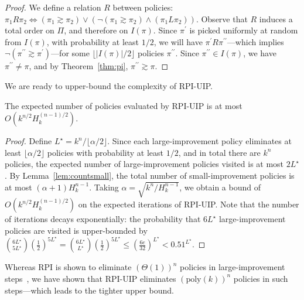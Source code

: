 \begin{proof}
We define a relation $R$ between policies: $\pi_{1}R\pi_{2} \iff (\pi_{1} \gtrsim \pi_{2}) \vee (\neg(\pi_{1} \gtrsim \pi_{2}) \wedge (\pi_{1}L\pi_{2}))$. Observe that $R$ induces a total order on $\Pi$, and therefore on $I(\pi)$. Since $\pi^{\prime}$ is picked uniformly at random from $I(\pi)$, with probability at least $1/2$, we will have $\pi^{\prime}R \pi^{\prime\prime}$---which implies $\neg(\pi^{\prime\prime} \gtrsim \pi^{\prime})$---for some  $\lfloor |I(\pi)| / 2 \rfloor$ policies $\pi^{\prime\prime}$. Since 
$\pi^{\prime\prime} \in I(\pi)$, we have
$\pi^{\prime\prime} \neq \pi$, and by Theorem~\ref{thm:pi}, $\pi^{\prime\prime} \gtrsim \pi.$
\end{proof}
We are ready to upper-bound the complexity of RPI-UIP.
\begin{theorem}
The expected number of policies evaluated by RPI-UIP is at most $O(k^{n/2}H_{k}^{(n - 1)/2})$.
\end{theorem}
\begin{proof}
Define $L^{\star} = k^{n}/\lfloor \alpha / 2\rfloor$. Since each large-improvement policy eliminates at least
$\lfloor \alpha / 2\rfloor$ policies with probability at least $1/2$, and in total there are $k^{n}$ policies, the expected number of large-improvement policies visited is at most $2L^{\star}$. 
By Lemma~\ref{lem:countsmall},
the total number of small-improvement policies is at most $(\alpha + 1)H_{k}^{n - 1}$.
Taking $\alpha = \sqrt{k^{n} / H_k^{n-1}}$, we obtain a bound of $O(k^{n/2}H_{k}^{(n - 1)/2})$ on the expected iterations of RPI-UIP. Note that the number of iterations decays exponentially:
the probability that $6L^{\star}$ large-improvement policies are visited is upper-bounded by  ${6L^{\star} \choose 5L^{\star}}\left(\frac{1}{2}\right)^{5L^{\star}} = {6L^{\star} \choose L^{\star}}\left(\frac{1}{2}\right)^{5L^{\star}} \leq \left(\frac{6e}{32}\right)^{L^{\star}} < 0.51^{L^{\star}}$.%
\end{proof}
Whereas RPI is shown to eliminate $(\Theta(1))^{n}$ policies in large-improvement steps~\cite{Mansour+Singh:1999}, we have shown that RPI-UIP eliminates $(\text{poly}(k))^{n}$ policies in such steps---which leads to the tighter upper bound.


